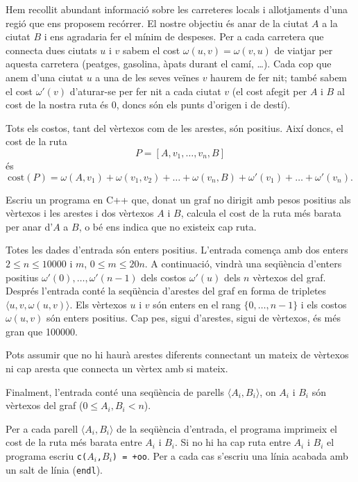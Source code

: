 \Statement
Hem recollit abundant informació sobre les carreteres locals i allotjaments
d'una regió que ens proposem recórrer. El nostre objectiu és anar de la ciutat
$A$ a la ciutat $B$ i ens agradaria fer el mínim de despeses. Per a cada
carretera que connecta dues ciutats $u$ i $v$ sabem el cost
$\omega(u,v)=\omega(v,u)$ de viatjar per aquesta carretera (peatges, gasolina,
àpats durant el camí, \ldots). Cada cop que anem d'una ciutat $u$ a una de les
seves veïnes $v$ haurem de fer nit; també sabem el cost
$\omega'(v)$ d'aturar-se per fer nit a cada ciutat $v$ (el cost afegit per
$A$ i $B$ al cost de la nostra ruta és 0, doncs són els punts d'origen
i de destí).

Tots els costos, tant del vèrtexos com de les arestes, són positius.
Així doncs, el cost de la ruta
\[
P = [A, v_1, \ldots, v_n, B]
\]
és
\[
  \text{cost}(P) = \omega(A,v_1) + \omega(v_1,v_2) + \ldots + \omega(v_n,B) 
  + \omega'(v_1)+\ldots+\omega'(v_n).
\]

Escriu un programa en C++ que, donat un graf no dirigit amb pesos positius
als vèrtexos i les arestes i dos vèrtexos $A$ i $B$, calcula el cost
de la ruta més
barata per anar d'$A$ a $B$, o bé ens indica que no existeix cap ruta.

\Input
Totes les dades d'entrada són enters positius.
L'entrada comença amb dos enters $2{\le}n{\le}10000$ i $m$, $0{\le}m\le{20n}$.
A continuació, vindrà una seqüència d'enters positius
$\omega'(0), \ldots, \omega'(n-1)$ dels costos $\omega'(u)$ dels $n$ vèrtexos
del graf. Després l'entrada conté la seqüència d'arestes del graf en forma
de tripletes ${\langle}u,v,\omega(u,v)\rangle$. Els vèrtexos 
$u$ i $v$ són enters en el rang $\{0,\ldots,n-1\}$ i els costos
$\omega(u,v)$ són enters positius.
Cap pes, sigui d'arestes, sigui de vèrtexos, és més gran que 100000.

Pots assumir que no hi haurà arestes diferents connectant un mateix
de vèrtexos ni cap aresta que connecta un vèrtex amb si mateix.

Finalment, l'entrada conté una seqüència de parells
${\langle}A_i, B_i\rangle$, on $A_i$ i $B_i$
són vèrtexos del graf ($0{\le}A_i,B_i<n$).

\Output
Per a cada parell ${\langle}A_i, B_i\rangle$ de la seqüència d'entrada,
el programa imprimeix el cost de la ruta més barata entre $A_i$ i $B_i$.
Si no hi ha cap ruta entre $A_i$ i $B_i$ el programa escriu
\texttt{c($A_i$,$B_i$) = +oo}. Per a cada cas s'escriu una línia
acabada amb un salt de línia (\texttt{endl}).

\SampleTwoCol
